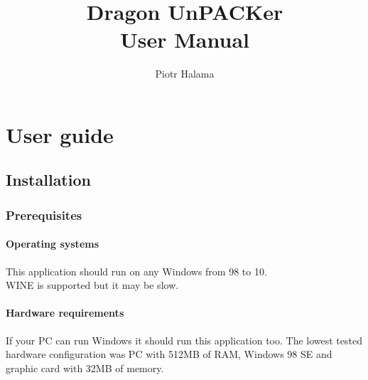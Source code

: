 \documentclass[10pt,a4paper,twoside]{book}
\author{Piotr Halama}
\title{Dragon UnPACKer\\
		User Manual}
\begin{document}
\maketitle
\thispagestyle{empty}
\vspace*{\fill}
\noindent
\doclicenseThis
\tableofcontents
\newpage

\part{User guide}
\chapter{Installation}
\section{Prerequisites}
\subsection{Operating systems}
This application should run on any Windows from 98 to 10.\\
WINE is supported but it may be slow.
\subsection{Hardware requirements}
If your PC can run Windows it should run this application too.
The lowest tested hardware configuration was PC with 512MB of RAM, Windows 98 SE and graphic card with 32MB of memory.
\newpage
\end{document}
